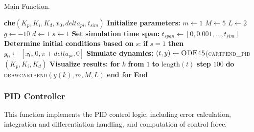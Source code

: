 \documentclass[journal,twoside,web]{ieeecolor}
\begin{document}
\begin{algorithm}[H]
\caption{Main Function.}\label{alg:che}
\begin{algorithmic}
\STATE \textbf{che}$(K_p, K_i, K_d, x_0, delta_{pi}, t_{sim})$
\STATE \hspace{0.5cm} \textbf{Initialize parameters:}
\STATE \hspace{1cm} $m \gets 1$ %
\STATE \hspace{1cm} $M \gets 5$ %
\STATE \hspace{1cm} $L \gets 2$ %
\STATE \hspace{1cm} $g \gets -10$ %
\STATE \hspace{1cm} $d \gets 1$ %
\STATE \hspace{1cm} $s \gets 1$ %
\STATE \hspace{0.5cm} \textbf{Set simulation time span:}
\STATE \hspace{1cm} $t_{span} \gets [0, 0.001, \dots, t_{sim}]$
\STATE \hspace{0.5cm} \textbf{Determine initial conditions based on} $s$:
\STATE \hspace{1cm} \textbf{if} $s = 1$ \textbf{then}
\STATE \hspace{1.5cm} $y_0 \gets [x_0, 0, \pi + delta_{pi}, 0]$
\STATE \hspace{0.5cm} \textbf{Simulate dynamics:}
\STATE \hspace{1cm} $(t, y) \gets \textsc{ODE45}$(\textsc{cartpend\_pid}$(K_p, K_i, K_d)$ 
\STATE \hspace{0.5cm} \textbf{Visualize results:}
\STATE \hspace{1cm} \textbf{for} $k$ \textbf{from} $1$ \textbf{to} $\text{length}(t)$ \textbf{step} $100$ \textbf{do}
\STATE \hspace{1.5cm} \textsc{drawcartpend}$(y(k), m, M, L)$
\STATE \hspace{1cm} \textbf{end for}
\STATE \textbf{End}
\end{algorithmic}
\end{algorithm}




\subsubsection{PID Controller }
This function implements the PID control logic, including error calculation, integration and differentiation handling, and computation of control force.
\end{document}
